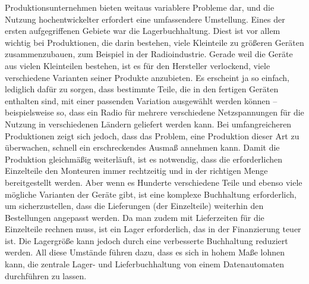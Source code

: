 {Produktionsunternehmen bieten weitaus variablere Probleme dar, und die Nutzung hochentwickelter  erfordert eine umfassendere Umstellung. Eines der ersten aufgegriffenen Gebiete war die Lagerbuchhaltung. Diest ist vor allem wichtig bei Produktionen, die darin bestehen, viele Kleinteile zu größeren Geräten zusammenzubauen, zum Beispiel in der Radioindustrie. Gerade weil die Geräte aus vielen Kleinteilen bestehen, ist es für den Hersteller verlockend, viele verschiedene Varianten seiner Produkte anzubieten. Es erscheint ja so einfach, lediglich dafür zu sorgen, dass bestimmte Teile, die in den fertigen Geräten enthalten sind, mit einer passenden Variation ausgewählt werden können -- beispielsweise so, dass ein Radio für mehrere verschiedene Netzspannungen für die Nutzung in verschiedenen Ländern geliefert werden kann. Bei umfangreicheren Produktionen zeigt sich jedoch, dass das Problem, eine Produktion dieser Art zu überwachen, schnell ein erschreckendes Ausmaß annehmen kann. Damit die Produktion gleichmäßig weiterläuft, ist es notwendig, dass die erforderlichen Einzelteile den Monteuren immer rechtzeitig und in der richtigen Menge bereitgestellt werden. Aber wenn es Hunderte verschiedene Teile und ebenso viele mögliche Varianten der Geräte gibt, ist eine komplexe Buchhaltung erforderlich, um sicherzustellen, dass die Lieferungen (der Einzelteile) weiterhin den Bestellungen angepasst werden. Da man zudem mit Lieferzeiten für die Einzelteile rechnen muss, ist ein Lager erforderlich, das in der Finanzierung teuer ist. Die Lagergröße kann jedoch durch eine verbesserte Buchhaltung reduziert werden. All diese Umstände führen dazu, dass es sich in hohem Maße lohnen kann, die zentrale Lager- und Lieferbuchhaltung von einem Datenautomaten durchführen zu lassen.
}


